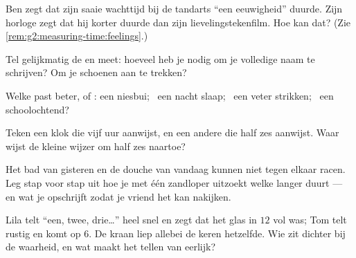 \begin{exercise}[$\star$]\label{exo:g2:measuring-time:5}
Ben zegt dat zijn saaie wachttijd bij de tandarts ``een eeuwigheid''
duurde. Zijn horloge zegt dat hij korter duurde dan zijn
lievelingstekenfilm. Hoe kan dat? (Zie
\cref{rem:g2:measuring-time:feelings}.)
\end{exercise}

\begin{exercise}[$\star$]\label{exo:g2:measuring-time:6}
Tel gelijkmatig de  en meet: hoeveel  heb je nodig om
je volledige naam te schrijven? Om je schoenen aan te trekken?
\end{exercise}

\begin{exercise}[$\star$]\label{exo:g2:measuring-time:7}
Welke  past beter,  of : een niesbui; \ een
nacht slaap; \ een veter strikken; \ een schoolochtend?
\end{exercise}

\begin{exercise}[$\star$]\label{exo:g2:measuring-time:8}
Teken een klok die vijf uur aanwijst, en een andere die half zes
aanwijst. Waar wijst de kleine wijzer om half zes naartoe?
\end{exercise}

\begin{exercise}[$\star\star$]\label{exo:g2:measuring-time:9}
Het bad van gisteren en de douche van vandaag kunnen niet tegen elkaar
racen. Leg stap voor stap uit hoe je met één zandloper uitzoekt welke
langer duurt --- en wat je opschrijft zodat je vriend het kan
nakijken.
\end{exercise}

\begin{exercise}[$\star\star$]\label{exo:g2:measuring-time:10}
Lila telt ``een, twee, drie\dots'' heel snel en zegt dat het glas in
$12$  vol was; Tom telt rustig en komt op $6$. De kraan liep
allebei de keren hetzelfde. Wie zit dichter bij de waarheid, en wat
maakt het tellen van  eerlijk?
\end{exercise}
